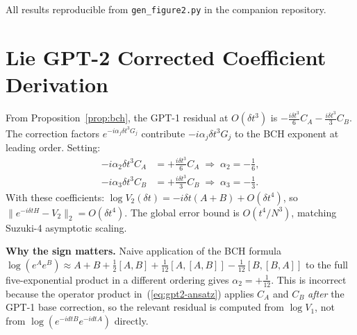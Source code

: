 \documentclass[aps,prxquantum,twocolumn,nofootinbib]{revtex4-2}
\begin{document}
All results reproducible from \texttt{gen\_figure2.py} in the
companion repository.

\section{Lie GPT-2 Corrected Coefficient Derivation}
\label{app:gpt2-coeffs}

From Proposition~\ref{prop:bch}, the GPT-1 residual at $O(\delta t^3)$
is $-\frac{i\delta t^3}{6}C_A - \frac{i\delta t^3}{3}C_B$.
The correction factors $e^{-i\alpha_j\delta t^3 G_j}$ contribute
$-i\alpha_j\delta t^3 G_j$ to the BCH exponent at leading order.
Setting:
\begin{align}
  -i\alpha_2\delta t^3 C_A &= +\frac{i\delta t^3}{6}C_A
  \;\Rightarrow\; \alpha_2 = -\tfrac{1}{6}, \\
  -i\alpha_3\delta t^3 C_B &= +\frac{i\delta t^3}{3}C_B
  \;\Rightarrow\; \alpha_3 = -\tfrac{1}{3}.
\end{align}
With these coefficients:
$\log V_2(\delta t) = -i\delta t(A+B) + O(\delta t^4)$,
so $\|e^{-i\delta t H}-V_2\|_2 = O(\delta t^4)$.
The global error bound is
$O(t^4/N^3)$, matching Suzuki-4 asymptotic scaling.

\textbf{Why the sign matters.} Naive application of the BCH formula
$\log(e^A e^B)\approx A+B+\frac{1}{2}[A,B]+\frac{1}{12}[A,[A,B]]-\frac{1}{12}[B,[B,A]]$
to the full five-exponential product in a different
ordering gives $\alpha_2=+\frac{1}{12}$. This is incorrect because
the operator product in~(\ref{eq:gpt2-ansatz}) applies $C_A$ and
$C_B$ \emph{after} the GPT-1 base correction, so the relevant
residual is computed from $\log V_1$, not from $\log(e^{-idt B}e^{-idt A})$
directly.
\end{document}
